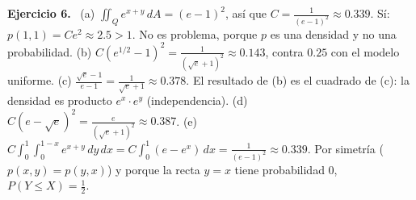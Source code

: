 \documentclass[11pt,a4paper]{article}
\newcommand{\sol}[1]{\par\medskip\noindent\textbf{Ejercicio #1.}\ }
\newcommand{\dA}{\,dA}
\begin{document}
\sol{6}
(a) $\iint_Qe^{x+y}\dA=(e-1)^2$, así que $C=\frac1{(e-1)^2}\approx0.339$. Sí: $p(1,1)=Ce^2\approx2.5>1$. No es problema, porque $p$ es una densidad y no una probabilidad.
(b) $C(e^{1/2}-1)^2=\frac1{(\sqrt e+1)^2}\approx0.143$, contra $0.25$ con el modelo uniforme.
(c) $\frac{\sqrt e-1}{e-1}=\frac1{\sqrt e+1}\approx0.378$. El resultado de (b) es el cuadrado de (c): la densidad es producto $e^x\cdot e^y$ (independencia).
(d) $C(e-\sqrt e)^2=\frac{e}{(\sqrt e+1)^2}\approx0.387$.
(e) $C\int_0^1\int_0^{1-x}e^{x+y}\,dy\,dx=C\int_0^1(e-e^x)\,dx=\frac1{(e-1)^2}\approx0.339$. Por simetría ($p(x,y)=p(y,x)$) y porque la recta $y=x$ tiene probabilidad 0, $P(Y\le X)=\frac12$.
\end{document}
